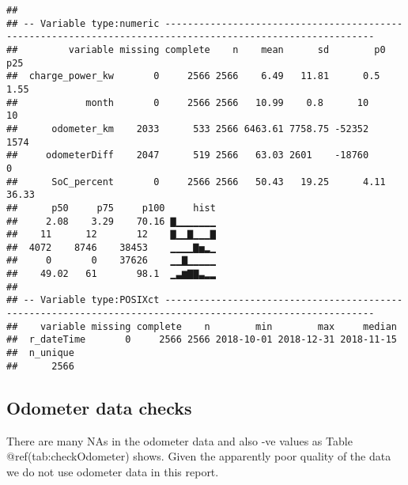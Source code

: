 \documentclass[]{article}
\newenvironment{Shaded}{\begin{snugshade}}{\end{snugshade}}
\newcommand{\DataTypeTok}[1]{\textcolor[rgb]{0.13,0.29,0.53}{#1}}
\newcommand{\DecValTok}[1]{\textcolor[rgb]{0.00,0.00,0.81}{#1}}
\newcommand{\ErrorTok}[1]{\textcolor[rgb]{0.64,0.00,0.00}{\textbf{#1}}}
\newcommand{\KeywordTok}[1]{\textcolor[rgb]{0.13,0.29,0.53}{\textbf{#1}}}
\newcommand{\NormalTok}[1]{#1}
\newcommand{\OperatorTok}[1]{\textcolor[rgb]{0.81,0.36,0.00}{\textbf{#1}}}
\newcommand{\StringTok}[1]{\textcolor[rgb]{0.31,0.60,0.02}{#1}}
\begin{document}
\begin{verbatim}
## 
## -- Variable type:numeric -----------------------------------------------------------------------------------------------------------
##         variable missing complete    n    mean      sd        p0     p25
##  charge_power_kw       0     2566 2566    6.49   11.81      0.5     1.55
##            month       0     2566 2566   10.99    0.8      10      10   
##      odometer_km    2033      533 2566 6463.61 7758.75 -52352    1574   
##     odometerDiff    2047      519 2566   63.03 2601    -18760       0   
##      SoC_percent       0     2566 2566   50.43   19.25      4.11   36.33
##      p50     p75     p100     hist
##     2.08    3.29    70.16 ▇▁▁▁▁▁▁▁
##    11      12       12    ▇▁▁▇▁▁▁▇
##  4072    8746    38453    ▁▁▁▁▇▅▂▁
##     0       0    37626    ▁▁▇▁▁▁▁▁
##    49.02   61       98.1  ▁▃▆▇▇▃▂▂
## 
## -- Variable type:POSIXct -----------------------------------------------------------------------------------------------------------
##    variable missing complete    n        min        max     median
##  r_dateTime       0     2566 2566 2018-10-01 2018-12-31 2018-11-15
##  n_unique
##      2566
\end{verbatim}

\hypertarget{odometer-data-checks}{%
\subsection{Odometer data checks}\label{odometer-data-checks}}

There are many NAs in the odometer data and also -ve values as Table @ref(tab:checkOdometer) shows. Given the apparently poor quality of the data we do not use odometer data in this report.

\begin{Shaded}
\end{Shaded}
\end{document}
